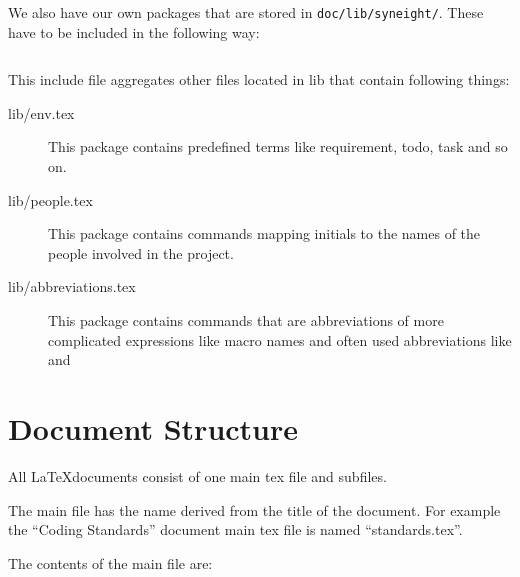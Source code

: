 We also have our own packages that are stored in \verb|doc/lib/syneight/|.
These have to be included in the following way:

\begin{verbatim}

\end{verbatim}

This include file aggregates other files located in lib that contain
following things:

\begin{description}
    \item[lib/env.tex] This package contains predefined terms like
        requirement, todo, task and so on. 

    \item[lib/people.tex] This package contains commands mapping
        initials to the names of the people involved in the
        \SYNEIGHT project.

    \item[lib/abbreviations.tex] This package contains commands that
        are abbreviations of more complicated expressions like
        macro names and often used abbreviations like \MMORG and
        \NVE
\end{description}


\section{Document Structure}
\label{sec:document-structure}

All \LaTeX documents consist of one main tex file and subfiles.

The main file has the name derived from the title of the document. For
example the ``Coding Standards'' document main tex file is named
``standards.tex''.

The contents of the main file are:


